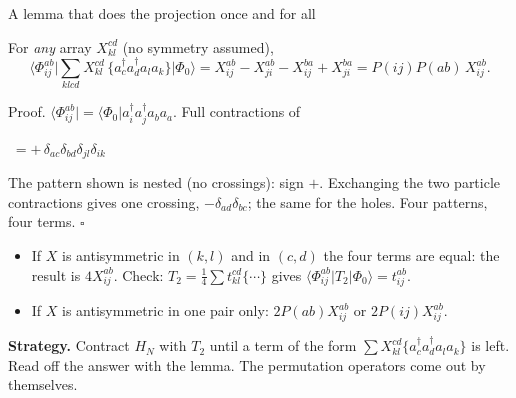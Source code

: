 \documentclass[aspectratio=169,10pt]{beamer}
\newcommand{\bra}[1]{\langle #1\vert}
\newcommand{\mel}[3]{\langle #1\lvert #2\rvert #3\rangle}
\newcommand{\cre}[1]{a_{#1}^{\dagger}}
\newcommand{\ann}[1]{a_{#1}}
\newcommand{\no}[1]{\bigl\{#1\bigr\}}
\newcommand{\ph}{\Phi_0}
\newcommand{\stepbox}[2]{%
  \begin{tcolorbox}[colback=paleblue,colframe=uioblue,title={\bfseries #1},left=4pt,right=4pt,top=2pt,bottom=2pt]
  #2
  \end{tcolorbox}}
\begin{document}
\begin{frame}[shrink=16]{A lemma that does the projection once and for all}
\small
\stepbox{Projection lemma}{For \emph{any} array $X_{kl}^{cd}$ (no symmetry assumed),
\[
 \mel{\Phi_{ij}^{ab}}{\sum_{klcd}X_{kl}^{cd}\,\no{\cre c\cre d\ann l\ann k}}{\ph}
 =X_{ij}^{ab}-X_{ji}^{ab}-X_{ij}^{ba}+X_{ji}^{ba}=P(ij)P(ab)\,X_{ij}^{ab}.
\]}
Proof. $\bra{\Phi_{ij}^{ab}}=\bra{\ph}\cre i\cre j\ann b\ann a$. Full contractions of
\begin{center}
$\;=+\,\delta_{ac}\delta_{bd}\delta_{jl}\delta_{ik}$
\end{center}
The pattern shown is nested (no crossings): sign $+$. Exchanging the two particle contractions gives one crossing, $-\delta_{ad}\delta_{bc}$; the same for the holes. Four patterns, four terms. \hfill$\square$
\begin{itemize}
\item If $X$ is antisymmetric in $(k,l)$ and in $(c,d)$ the four terms are equal: the result is $4X_{ij}^{ab}$. Check: $T_2=\tfrac14\sum t_{kl}^{cd}\no{\cdots}$ gives $\mel{\Phi_{ij}^{ab}}{T_2}{\ph}=t_{ij}^{ab}$.
\item If $X$ is antisymmetric in one pair only: $2P(ab)X_{ij}^{ab}$ or $2P(ij)X_{ij}^{ab}$.
\end{itemize}
\textbf{Strategy.} Contract $H_N$ with $T_2$ until a term of the form $\sum X_{kl}^{cd}\no{\cre c\cre d\ann l\ann k}$ is left. Read off the answer with the lemma. The permutation operators come out by themselves.
\end{frame}
\end{document}
